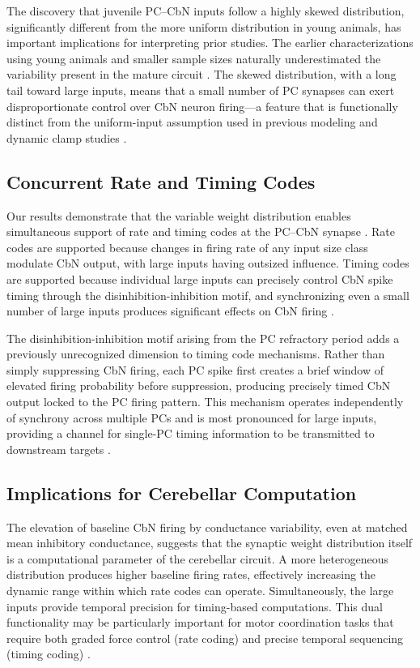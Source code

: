 \documentclass[12pt]{article}
\begin{document}
The discovery that juvenile PC--CbN inputs follow a highly skewed distribution, significantly different from the more uniform distribution in young animals, has important implications for interpreting prior studies. The earlier characterizations using young animals and smaller sample sizes naturally underestimated the variability present in the mature circuit \citep{person2012purkinje, telgkamp2004maintenance}. The skewed distribution, with a long tail toward large inputs, means that a small number of PC synapses can exert disproportionate control over CbN neuron firing---a feature that is functionally distinct from the uniform-input assumption used in previous modeling and dynamic clamp studies \citep{gauck2000control, abbasi2017robust}.

\subsection{Concurrent Rate and Timing Codes}

Our results demonstrate that the variable weight distribution enables simultaneous support of rate and timing codes at the PC--CbN synapse \citep{heck2013cerbellar, deschutter1999cerebellar}. Rate codes are supported because changes in firing rate of any input size class modulate CbN output, with large inputs having outsized influence. Timing codes are supported because individual large inputs can precisely control CbN spike timing through the disinhibition-inhibition motif, and synchronizing even a small number of large inputs produces significant effects on CbN firing \citep{person2012purkinje, bengtsson2011purkinje}.

The disinhibition-inhibition motif arising from the PC refractory period adds a previously unrecognized dimension to timing code mechanisms. Rather than simply suppressing CbN firing, each PC spike first creates a brief window of elevated firing probability before suppression, producing precisely timed CbN output locked to the PC firing pattern. This mechanism operates independently of synchrony across multiple PCs and is most pronounced for large inputs, providing a channel for single-PC timing information to be transmitted to downstream targets \citep{raman2000resurgent}.

\subsection{Implications for Cerebellar Computation}

The elevation of baseline CbN firing by conductance variability, even at matched mean inhibitory conductance, suggests that the synaptic weight distribution itself is a computational parameter of the cerebellar circuit. A more heterogeneous distribution produces higher baseline firing rates, effectively increasing the dynamic range within which rate codes can operate. Simultaneously, the large inputs provide temporal precision for timing-based computations. This dual functionality may be particularly important for motor coordination tasks that require both graded force control (rate coding) and precise temporal sequencing (timing coding) \citep{ito2006cerebellar, wu2019bhatt}.
\end{document}

